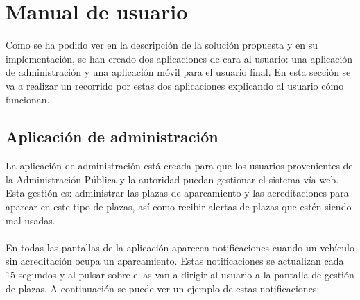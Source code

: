 \newpage
\chapter{Manual de usuario}
Como se ha podido ver en la descripción de la solución propuesta y en su implementación, se han creado dos aplicaciones de cara al usuario: una aplicación de administración y una aplicación móvil para el usuario final. En esta sección se va a realizar un recorrido por estas dos aplicaciones explicando al usuario cómo funcionan.
\section{Aplicación de administración}
La aplicación de administración está creada para que los usuarios provenientes de la Administración Pública y la autoridad puedan gestionar el sistema vía web. Esta gestión es: administrar las plazas de aparcamiento y las acreditaciones para aparcar en este tipo de plazas, así como recibir alertas de plazas que estén siendo mal usadas.
\\\\
En todas las pantallas de la aplicación aparecen notificaciones cuando un vehículo sin acreditación ocupa un aparcamiento. Estas notificaciones se actualizan cada 15 segundos y al pulsar sobre ellas van a dirigir al usuario a la pantalla de gestión de plazas. A continuación se puede ver un ejemplo de estas notificaciones:

